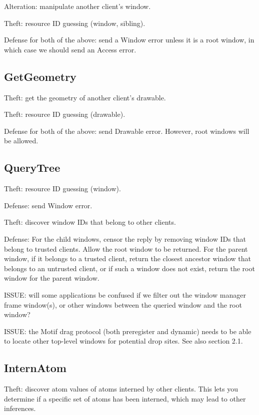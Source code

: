 \documentclass{article}
\begin{document}
Alteration: manipulate another client's window.

Theft: resource ID guessing (window, sibling).

Defense for both of the above: send a Window error unless it is a root
window, in which case we should send an Access error.



\subsection{GetGeometry}

Theft: get the geometry of another client's drawable.

Theft: resource ID guessing (drawable).

Defense for both of the above: send Drawable error.  However, root
windows will be allowed.



\subsection{QueryTree}

Theft: resource ID guessing (window).

Defense: send Window error.

Theft: discover window IDs that belong to other clients.

Defense: For the child windows, censor the reply by removing window
IDs that belong to trusted clients.  Allow the root window to be
returned.  For the parent window, if it belongs to a trusted client,
return the closest ancestor window that belongs to an untrusted
client, or if such a window does not exist, return the root window for
the parent window.

ISSUE: will some applications be confused if we filter out the window
manager frame window(s), or other windows between the queried window
and the root window?

ISSUE: the Motif drag protocol (both preregister and dynamic) needs to
be able to locate other top-level windows for potential drop sites.
See also section 2.1.


\subsection{InternAtom}

Theft: discover atom values of atoms interned by other clients.
This lets you determine if a specific set of atoms has been
interned, which may lead to other inferences.
\end{document}
